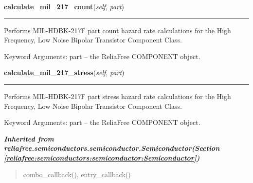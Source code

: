     \label{reliafree:semiconductors:transistor:HFLNBipolar:calculate_mil_217_count}

    \vspace{0.5ex}

\hspace{.8\funcindent}\begin{boxedminipage}{\funcwidth}

    \raggedright \textbf{calculate\_mil\_217\_count}(\textit{self}, \textit{part})

    \vspace{-1.5ex}

    \rule{\textwidth}{0.5\fboxrule}
\setlength{\parskip}{2ex}
    Performs MIL-HDBK-217F part count hazard rate calculations for the High
    Frequency, Low Noise Bipolar Transistor Component Class.

    Keyword Arguments: part -- the ReliaFree COMPONENT object.

\setlength{\parskip}{1ex}
    \end{boxedminipage}

    \label{reliafree:semiconductors:transistor:HFLNBipolar:calculate_mil_217_stress}

    \vspace{0.5ex}

\hspace{.8\funcindent}\begin{boxedminipage}{\funcwidth}

    \raggedright \textbf{calculate\_mil\_217\_stress}(\textit{self}, \textit{part})

    \vspace{-1.5ex}

    \rule{\textwidth}{0.5\fboxrule}
\setlength{\parskip}{2ex}
    Performs MIL-HDBK-217F part stress hazard rate calculations for the 
    High Frequency, Low Noise Bipolar Transistor Component Class.

    Keyword Arguments: part -- the ReliaFree COMPONENT object.

\setlength{\parskip}{1ex}
    \end{boxedminipage}


\large{\textbf{\textit{Inherited from reliafree.semiconductors.semiconductor.Semiconductor\textit{(Section \ref{reliafree:semiconductors:semiconductor:Semiconductor})}}}}

\begin{quote}
combo\_callback(), entry\_callback()
\end{quote}
